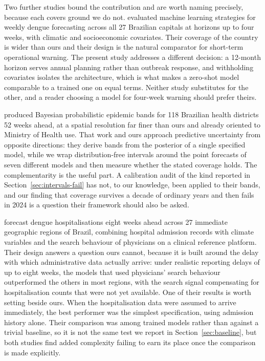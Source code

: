 \documentclass[11pt]{article}
\begin{document}
Two further studies bound the contribution and are worth naming precisely, because each
covers ground we do not. \citet{Silva2026capitals} evaluated machine learning strategies
for weekly dengue forecasting across all 27 Brazilian capitals at horizons up to four
weeks, with climatic and socioeconomic covariates. Their coverage of the country is
wider than ours and their design is the natural comparator for short-term operational
warning. The present study addresses a different decision: a 12-month horizon serves
annual planning rather than outbreak response, and withholding covariates isolates the
architecture, which is what makes a zero-shot model comparable to a trained one on equal
terms. Neither study substitutes for the other, and a reader choosing a model for
four-week warning should prefer theirs.

\citet{Freitas2025bands} produced Bayesian probabilistic epidemic bands for 118 Brazilian
health districts 52 weeks ahead, at a spatial resolution far finer than ours and already
oriented to Ministry of Health use. That work and ours approach predictive uncertainty
from opposite directions: they derive bands from the posterior of a single specified
model, while we wrap distribution-free intervals around the point forecasts of seven
different models and then measure whether the stated coverage holds. The complementarity
is the useful part. A calibration audit of the kind reported in
Section~\ref{sec:intervals-fail} has not, to our knowledge, been applied to their bands,
and our finding that coverage survives a decade of ordinary years and then fails in 2024
is a question their framework should also be asked.

\citet{Palmer2026hosp} forecast dengue hospitalisations eight weeks ahead across 27
immediate geographic regions of Brazil, combining hospital admission records with climate
variables and the search behaviour of physicians on a clinical reference platform. Their
design answers a question ours cannot, because it is built around the delay with which
administrative data actually arrive: under realistic reporting delays of up to eight
weeks, the models that used physicians' search behaviour outperformed the others in most
regions, with the search signal compensating for hospitalisation counts that were not yet
available. One of their results is worth setting beside ours. When the hospitalisation
data were assumed to arrive immediately, the best performer was the simplest
specification, using admission history alone. Their comparison was among trained models
rather than against a trivial baseline, so it is not the same test we report in
Section~\ref{sec:baseline}, but both studies find added complexity failing to earn its
place once the comparison is made explicitly.
\end{document}
